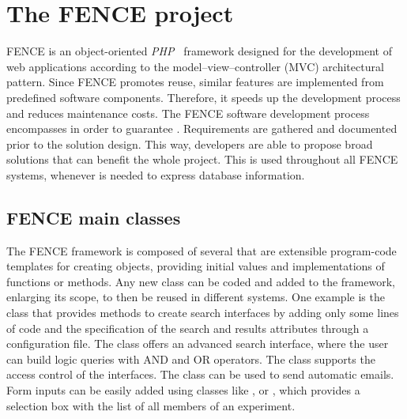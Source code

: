
\section{The FENCE project}%
\label{sec:The_FENCE_project}

FENCE is an object-oriented \textit{PHP}~\cite{php} framework designed for the development of web applications according to the model–view–controller (MVC) architectural pattern.
Since FENCE promotes reuse, similar features are implemented from predefined software components.
Therefore, it speeds up the development process and reduces maintenance costs.
The FENCE software development process encompasses  in order to guarantee . Requirements are gathered and documented prior to the solution design.
This way, developers are able to propose broad solutions that can benefit the whole project.
This  is used throughout all FENCE systems, whenever is needed to express database information.


\subsection{FENCE main classes}%
\label{sec:FENCE_main_classes}

The FENCE framework is composed of several  that are extensible program-code templates for creating objects, providing initial values and implementations of functions or methods.
Any new class can be coded and added to the framework, enlarging its scope, to then be reused in different systems.
One example is the  class that provides methods to create search interfaces by adding only some lines of code and the specification of the search and results attributes through a configuration file.
The  class offers an advanced search interface, where the user can build logic queries with AND and OR operators.
The  class supports the access control of the interfaces.
The  class can be used to send automatic emails.
Form inputs can be easily added using classes like ,  or , which provides a selection box with the list of all members of an experiment.

